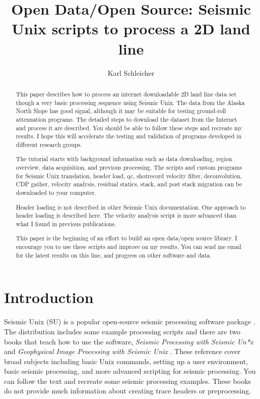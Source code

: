 
\title{Open Data/Open Source: Seismic Unix scripts to process a 2D land line}               %
\author{Karl Schleicher}

\maketitle

\begin{abstract}
This paper describes how to process an internet downloadable 2D land 
line data set though a very basic processing sequence using Seismic 
Unix. The data from the Alaska North Slope has good signal, 
although it may be suitable for testing ground-roll attenuation 
programs.  The detailed steps to download the dataset from the 
Internet and process it are described.  You should be able to 
follow these steps and recreate my results.  I hope this will 
accelerate the testing and validation of programs developed in different
research groups.
\par
The tutorial starts with background information such as data downloading,
region overview, data acquisition, and previous processing.  The
scripts and custom programs for Seismic Unix translation, header load, 
qc, shotrecord velocity filter, deconvolution, CDP gather, velocity 
analysis, residual statics, stack, and post stack migration can be 
downloaded to your computer.

Header loading is not described in other Seismic Unix documentation.
One approach to header loading is described here.  The velocity
analysis script is more advanced than what I found in previous publications.

This paper is the beginning of an effort to build an open data/open source 
library.  I encourage you to use these scripts and improve on my results.  
You can send me email for the latest results on this line, and progress on other 
software and data.
\end{abstract}

\section{Introduction}
Seismic Unix (SU) is a popular open-source seismic processing software
package \cite[]{TLE16-07-10451049,cohen}.  The distribution
includes some example processing scripts and there are two books that
teach how to use the software, \emph{Seismic Processing with Seismic
  Un*x} \cite[]{forel} and \emph{Geophysical Image Processing with
  Seismic Unix} \cite[]{stockwell} .  These reference cover broad
subjects including basic Unix commands, setting up a user environment,
basic seismic processing, and more advanced scripting for seismic
processing.  You can follow the text and recreate some seismic
processing examples.  These books do not provide much information
about creating trace headers or preprocessing.\nocite{cohen}

